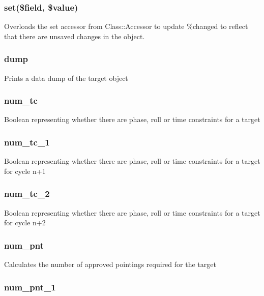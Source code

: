 \documentclass{article}
\begin{document}
\subsubsection*{set(\$field, \$value)\label{Target_set_field_value_}}


Overloads the set accessor from Class::Accessor to update \%changed to
reflect that there are unsaved changes in the object.

\subsubsection*{dump\label{Target_dump}}


Prints a data dump of the target object

\subsubsection*{num\_tc\label{Target_num_tc}}


Boolean representing whether there are phase, roll or time constraints
for a target

\subsubsection*{num\_tc\_1\label{Target_num_tc_1}}


Boolean representing whether there are phase, roll or time constraints
for a target for cycle n+1

\subsubsection*{num\_tc\_2\label{Target_num_tc_2}}


Boolean representing whether there are phase, roll or time constraints
for a target for cycle n+2

\subsubsection*{num\_pnt\label{Target_num_pnt}}


Calculates the number of approved pointings required for the target

\subsubsection*{num\_pnt\_1\label{Target_num_pnt_1}}
\end{document}
